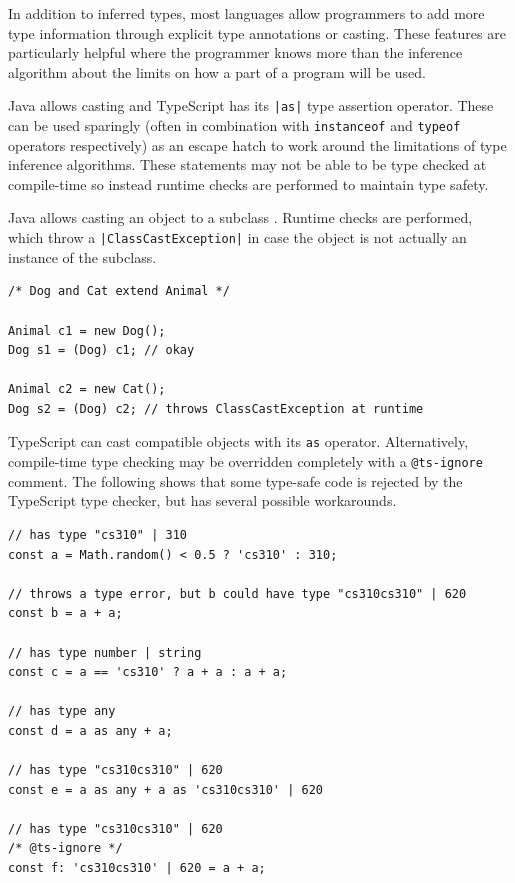 \documentclass[a4paper,fleqn,oneside,12pt]{report}
\begin{document}
In addition to inferred types, most languages allow programmers to add more type information through explicit type annotations or casting. These features are particularly helpful where the programmer knows more than the inference algorithm about the limits on how a part of a program will be used.

Java allows casting and TypeScript has its \texttt{|as|} type assertion operator. These can be used sparingly (often in combination with \texttt{instanceof} and \texttt{typeof} operators respectively) as an escape hatch to work around the limitations of type inference algorithms. These statements may not be able to be type checked at compile-time so instead runtime checks are performed to maintain type safety.

Java allows casting an object to a subclass \citep{ref25}. Runtime checks are performed, which throw a \texttt{|ClassCastException|} in case the object is not actually an instance of the subclass.

\begin{verbatim}
/* Dog and Cat extend Animal */

Animal c1 = new Dog();
Dog s1 = (Dog) c1; // okay

Animal c2 = new Cat();
Dog s2 = (Dog) c2; // throws ClassCastException at runtime
\end{verbatim}

TypeScript can cast compatible objects with its \texttt{as} operator. Alternatively, compile-time type checking may be overridden completely with a \texttt{@ts-ignore} comment. The following shows that some type-safe code is rejected by the TypeScript type checker, but has several possible workarounds.

\begin{verbatim}
// has type "cs310" | 310
const a = Math.random() < 0.5 ? 'cs310' : 310;

// throws a type error, but b could have type "cs310cs310" | 620
const b = a + a;

// has type number | string
const c = a == 'cs310' ? a + a : a + a;

// has type any
const d = a as any + a;

// has type "cs310cs310" | 620
const e = a as any + a as 'cs310cs310' | 620

// has type "cs310cs310" | 620
/* @ts-ignore */
const f: 'cs310cs310' | 620 = a + a;
\end{verbatim}
\end{document}
